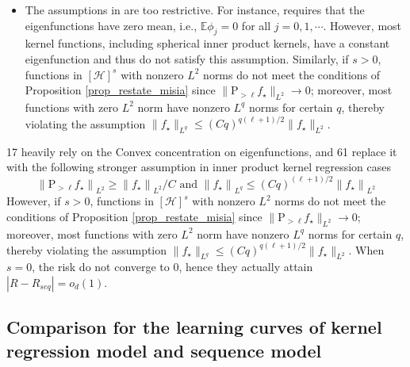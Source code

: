\documentclass{article}
\theoremstyle{plain}
\theoremstyle{definition}
\theoremstyle{remark}
\newcommand{\calH}{\mathcal{H}}
\begin{document}
\begin{appendix}
{\begin{itemize}
    \item The assumptions in \cite{cheng2022dimension, misiakiewicz2024non} are too restrictive. For instance, \cite{cheng2022dimension} requires that the eigenfunctions have zero mean, i.e., \(\mathbb{E}\phi_j = 0\) for all \(j = 0, 1, \cdots\). However, most kernel functions, including spherical inner product kernels, have a constant eigenfunction and thus do not satisfy this assumption. Similarly, if \(s>0\), functions in \([\calH]^{s}\) with nonzero \(L^2\) norms do not meet the conditions of Proposition \ref{prop_restate_misia} since \(\|\mathrm{P}_{>\ell} f_{\star}\|_{L^2} \to 0\); moreover, most functions with zero \(L^2\) norm have nonzero \(L^{q}\) norms for certain \(q\), thereby violating the assumption \(\|f_{\star}\|_{L^q} \leq (Cq)^{q(\ell+1)/2}\|f_{\star}\|_{L^2}\).
    
\end{itemize}
}


{\color{red}
17 heavily rely on the Convex concentration on eigenfunctions, and 61 replace it with the following stronger assumption in inner product kernel regression cases
$$
\left\|\mathrm{P}_{>\ell} f_{\star}\right\|_{L^2} \geq\left\|f_{\star}\right\|_{L^2} / C \text{ and } \left\|f_{\star}\right\|_{L^q} \leq (C q)^{(\ell+1) / 2}\left\|f_{\star}\right\|_{L^2}
$$
However, if \(s>0\), functions in \([\calH]^{s}\) with nonzero \(L^2\) norms do not meet the conditions of Proposition \ref{prop_restate_misia} since \(\|\mathrm{P}_{>\ell} f_{\star}\|_{L^2} \to 0\); moreover, most functions with zero \(L^2\) norm have nonzero \(L^{q}\) norms for certain \(q\), thereby violating the assumption \(\|f_{\star}\|_{L^q} \leq (Cq)^{q(\ell+1)/2}\|f_{\star}\|_{L^2}\).
When $s=0$, the risk do not converge to $0$, hence they actually attain $|R-R_{seq}|=o_d(1)$.



}
\fi












\subsection{Comparison for the learning curves of kernel regression model and sequence model}\label{sec_sequence_model}



\end{appendix}
\end{document}
